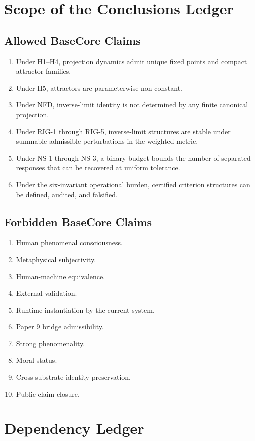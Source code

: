 ﻿\section{Scope of the Conclusions Ledger}

\subsection{Allowed BaseCore Claims}
\begin{enumerate}[leftmargin=*]
\item Under H1--H4, projection dynamics admit unique fixed points and compact attractor families.
\item Under H5, attractors are parameterwise non-constant.
\item Under NFD, inverse-limit identity is not determined by any finite canonical projection.
\item Under RIG-1 through RIG-5, inverse-limit structures are stable under summable admissible perturbations in the weighted metric.
\item Under NS-1 through NS-3, a binary budget bounds the number of separated responses that can be recovered at uniform tolerance.
\item Under the six-invariant operational burden, certified criterion structures can be defined, audited, and falsified.
\end{enumerate}

\subsection{Forbidden BaseCore Claims}
\begin{enumerate}[leftmargin=*]
\item Human phenomenal consciousness.
\item Metaphysical subjectivity.
\item Human-machine equivalence.
\item External validation.
\item Runtime instantiation by the current system.
\item Paper 9 bridge admissibility.
\item Strong phenomenality.
\item Moral status.
\item Cross-substrate identity preservation.
\item Public claim closure.
\end{enumerate}

\section{Dependency Ledger}

